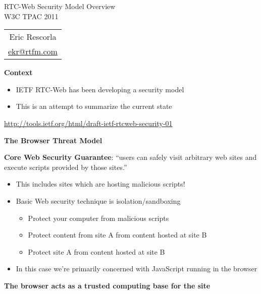 \documentclass[helvetica]{seminar}
\newcommand{\heading}[1]{%
  \begin{center} 
    \large\bf 
    #1 
  \end{center} 
  \vspace{.4 in}}
\begin{document}
\begin{slide}
\begin{center}
\vspace{1 in}
\LARGE{{\bf}RTC-Web Security Model Overview}\\
\vspace{.2in}
\large{{W3C TPAC 2011}} \\
\vspace{3em}
\large{
\begin{tabular}{c}
Eric Rescorla \\
\url{ekr@rtfm.com}
\end{tabular}
}
\end{center}

\end{slide}


\centerslidesfalse 



\begin{slide}
\heading{Context}

\begin{itemize}
\item IETF RTC-Web has been developing a security model
\item This is an attempt to summarize the current state
\end{itemize}

\url{http://tools.ietf.org/html/draft-ietf-rtcweb-security-01}

\end{slide}


\begin{slide}
\heading{The Browser Threat Model}

\textbf{Core Web Security Guarantee}: ``users can safely visit arbitrary web sites
and execute scripts provided by those sites.''\cite{huang-cache}

\vspace{1em}

\begin{itemize}
\item This includes sites which are hosting malicious scripts!
\item Basic Web security technique is isolation/sandboxing
  \begin{itemize}
  \item Protect your computer from malicious scripts
  \item Protect content from site A from content hosted at site B
  \item Protect site A from content hosted at site B
  \end{itemize}
\item In this case we're primarily concerned with JavaScript running in the browser
\end{itemize}

\textbf{The browser acts as a trusted computing base for the site}

\end{slide}
\end{document}
